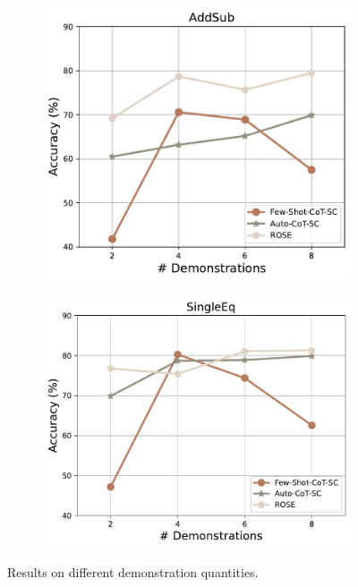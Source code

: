 \documentclass[11pt]{article}
\begin{document}
\begin{figure}[t!]
    \centering
    \begin{subfigure}{0.45\linewidth}
    \centering
    \includegraphics[width=\linewidth]{pics/shot1.pdf}
    \end{subfigure}
    \begin{subfigure}{0.49\linewidth}
    \centering
    \includegraphics[width=\linewidth]{pics/shot2.pdf}
    \end{subfigure}
    \caption{Results on different demonstration quantities. \vspace{-0.8cm}}
    \label{fig:shot}
\end{figure}
\end{document}
